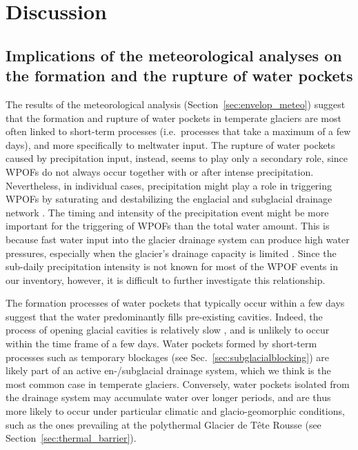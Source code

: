 \section{ Discussion}

\subsection{ Implications of the meteorological analyses on the formation and the rupture of water pockets}

The results of the meteorological analysis (Section~\ref{sec:envelop_meteo}) suggest that the formation and rupture of water pockets in temperate glaciers are most often linked to short-term processes (i.e.\ processes that take a maximum of a few days), and more specifically to meltwater input. The rupture of water pockets caused by precipitation input, instead, seems to play only a secondary role, since WPOFs do not always occur together with or after intense precipitation. Nevertheless, in individual cases, precipitation might play a role in triggering WPOFs by saturating and destabilizing the englacial and subglacial drainage network \citep[e.g.][]{Warburton&Fenn1994}. The timing and intensity of the precipitation event might be more important for the triggering of WPOFs than the total water amount. This is because fast water input into the glacier drainage system can produce high water pressures, especially when the glacier's drainage capacity is limited \citep[e.g.][]{Warburton&Fenn1994,Sugiyama&Gudmundsson2004}. Since the sub-daily precipitation intensity is not known for most of the WPOF events in our inventory, however, it is difficult to further investigate this relationship.

The formation processes of water pockets that typically occur within a few days suggest that the water predominantly fills pre-existing cavities. Indeed, the process of opening glacial cavities is relatively slow \citep[e.g.][]{Vincent&al2015}, and is unlikely to occur within the time frame of a few days. Water pockets formed by short-term processes such as temporary blockages (see Sec.~\ref{sec:subglacialblocking}) are likely part of an active en-/subglacial drainage system, which we think is the most common case in temperate glaciers. Conversely, water pockets isolated from the drainage system may accumulate water over longer periods, and are thus more likely to occur under particular climatic and glacio-geomorphic conditions, such as the ones prevailing at the polythermal Glacier de Tête Rousse (see Section~\ref{sec:thermal_barrier}).


